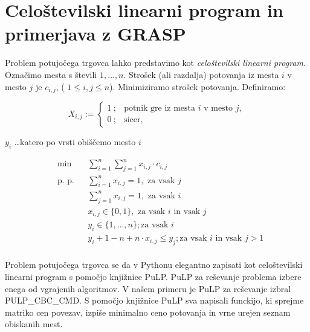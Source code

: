 \documentclass[12pt,a4paper]{amsart}
\theoremstyle{definition} %
\theoremstyle{plain} %
\begin{document}
\section{Celoštevilski linearni program in primerjava z GRASP} 

Problem potujočega trgovca lahko predstavimo kot \textit{celoštevilski linearni program}.
Označimo mesta s števili $1, \ldots, n$. Strošek (ali razdalja) potovanja iz mesta $i$ v mesto $j$ je $c_{i,j}$, ( $ 1\leq i, j\leq n$). Minimiziramo strošek potovanja. Definiramo:

$$ X_{i,j} := \left\{ \begin{array}{ll}
1 ~; & \textrm{potnik gre iz mesta $i$ v mesto $j$}, \\
0 ~; & \textrm{sicer},
\end{array} \right. $$

\hfill \break

$y_{i}$ \ldots katero po vrsti obiščemo mesto $i$

\begin{equation*}
\begin{aligned}
& {\text{min}}
& & \sum_{i=1}^{n} \sum_{j=1}^{n}  x_{i,j} \cdot c_{i,j} \\
& \text{p. p.}
& &\sum_{i=1}^{n} x_{i,j} = 1, \text{ za vsak $j$ }\\
&&&\sum_{j=1}^{n} x_{i,j} = 1, \text{ za vsak $i$ }\\
&&&  x_{i,j} \in \{0,1\}, \text{ za vsak $i$ in vsak $j$ }\\
&&& y_{i} \in \{1, \ldots, n\}; \text{za vsak $i$}\\
&&& y_{i} + 1 - n + n \cdot x_{i,j} \leq y_{j}; \text{za vsak $i$ in vsak $j>1$}
\end{aligned}
\end{equation*}
\\
Problem potujočega trgovca se da v Pythonu elegantno zapisati kot celoštevilski linearni program s pomočjo knjižnice PuLP. PuLP za reševanje problema izbere enega od vgrajenih algoritmov. V našem primeru je PuLP za reševanje izbral PULP\_CBC\_CMD. S pomočjo knjižnice PuLP sva napisali funckijo, ki sprejme matriko cen povezav, izpiše minimalno ceno potovanja in vrne urejen seznam obiskanih mest.
\end{document}
